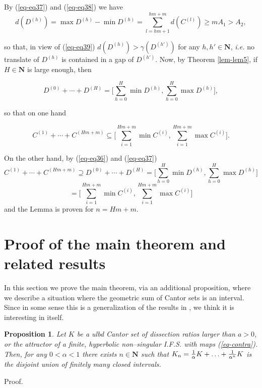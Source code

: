 \documentclass[final,epsfig,amsfont]{article}
\newtheorem{proposition}[theorem]{Proposition}
\begin{document}
By (\ref{eq-eq37}) and (\ref{eq-eq38}) we have
$$d(D^{(h)})=\max D^{(h)}-\min D^{(h)}
=\sum\limits_{l=hm+1}^{hm+m} d(C^{(l)})\ge mA_1>A_2,
$$

so that, in view of (\ref{eq-eq39}) $d(D^{(h)}) > \gamma(D^{(h')})$ for any $h,h' \in {\mathbf N}$, {\em i.e.} no translate of $D^{(h)}$ is contained in a gap of
$D^{(h')}$. Now, by Theorem \ref{lem-lem5}, if $H \in {\mathbf N}$ is large enough, then

$$D^{(0)}+\cdots+D^{(H)}=
\Big[ \sum\limits_{h=0}^H\min D^{(h)}, \sum\limits_{h=0}^H\max D^{(h)}\Big],$$

so that on one hand

$$C^{(1)}+\cdots + C^{(Hm+m)}\subseteq
\Big[\sum\limits_{i=1}^{Hm+m}\min C^{(i)}, \sum\limits_{i=1}^{Hm+m}\max
C^{(i)}\Big].$$

On the other hand, by (\ref{eq-eq36}) and (\ref{eq-eq37})
$$C^{(1)}+\cdots + C^{(Hm+m)}\supseteq D^{(0)}+\cdots+D^{(H)}=
\Big[ \sum\limits_{h=0}^H\min D^{(h)}, \sum\limits_{h=0}^H\max D^{(h)}\Big]$$
$$=\Big[\sum\limits_{i=1}^{Hm+m}\min C^{(i)},
\sum\limits_{i=1}^{Hm+m}\max C^{(i)}\Big]
$$
and the Lemma is proven for $n=Hm+m$. {\quad \vrule height .9ex width .8ex depth -.1ex}

\section{Proof of the main theorem and related results}
\label{sec-proof}

In this section we prove the main theorem, via an additional proposition, where we describe a situation where the geometric sum of Cantor sets is an interval. Since in some sense this is a generalization of the results in \cite{cabrelli}, we think it is interesting in itself.

\begin{proposition}
\label{lem-lem10}
Let $K$ be a ulbd Cantor set of dissection ratios larger than $a>0$, or the attractor of a finite, hyperbolic non--singular I.F.S. with maps (\ref{eq-contra}). Then, for any $0<\alpha<1$ there exists $n \in {\mathbf N}$  such that
$K_n={1\over\alpha}K+\ldots+{1\over\alpha^n}K$ is the disjoint union of finitely many closed intervals.
\end{proposition}

{\smallskip Proof.\ }
\end{document}
